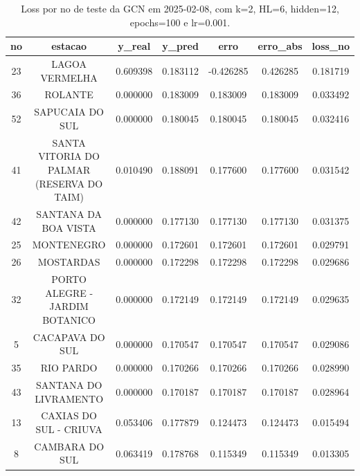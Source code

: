 \begin{table}[h]
\centering
\caption{Loss por no de teste da GCN em 2025-02-08, com k=2, HL=6, hidden=12, epochs=100 e lr=0.001.}
\label{tab:gcn_loss_k2_hl6_h12_e100_d20250208}
\begin{tabular}{ccccccc}
\toprule
no & estacao & y\_real & y\_pred & erro & erro\_abs & loss\_no \\
\midrule
23 & LAGOA VERMELHA & 0.609398 & 0.183112 & -0.426285 & 0.426285 & 0.181719 \\
36 & ROLANTE & 0.000000 & 0.183009 & 0.183009 & 0.183009 & 0.033492 \\
52 & SAPUCAIA DO SUL & 0.000000 & 0.180045 & 0.180045 & 0.180045 & 0.032416 \\
41 & SANTA VITORIA DO PALMAR (RESERVA DO TAIM) & 0.010490 & 0.188091 & 0.177600 & 0.177600 & 0.031542 \\
42 & SANTANA DA BOA VISTA & 0.000000 & 0.177130 & 0.177130 & 0.177130 & 0.031375 \\
25 & MONTENEGRO & 0.000000 & 0.172601 & 0.172601 & 0.172601 & 0.029791 \\
26 & MOSTARDAS & 0.000000 & 0.172298 & 0.172298 & 0.172298 & 0.029686 \\
32 & PORTO ALEGRE - JARDIM BOTANICO & 0.000000 & 0.172149 & 0.172149 & 0.172149 & 0.029635 \\
5 & CACAPAVA DO SUL & 0.000000 & 0.170547 & 0.170547 & 0.170547 & 0.029086 \\
35 & RIO PARDO & 0.000000 & 0.170266 & 0.170266 & 0.170266 & 0.028990 \\
43 & SANTANA DO LIVRAMENTO & 0.000000 & 0.170187 & 0.170187 & 0.170187 & 0.028964 \\
13 & CAXIAS DO SUL - CRIUVA & 0.053406 & 0.177879 & 0.124473 & 0.124473 & 0.015494 \\
8 & CAMBARA DO SUL & 0.063419 & 0.178768 & 0.115349 & 0.115349 & 0.013305 \\
\bottomrule
\end{tabular}
\end{table}
